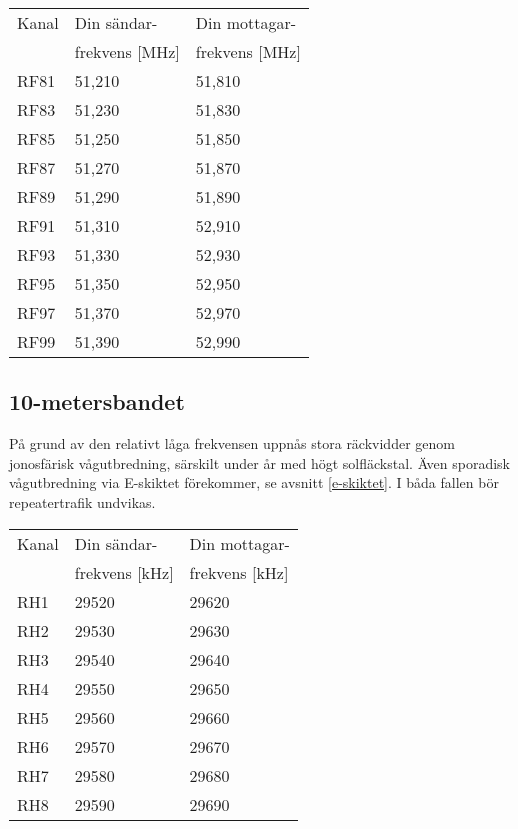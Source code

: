 \bigskip

\begin{tabular}{ l | l | l }
  Kanal & Din sändar- & Din mottagar- \\
        & frekvens [\si{\mega\hertz}] & frekvens [\si{\mega\hertz}] \\
  \hline
  RF81 & 51,210 & 51,810 \\
  RF83 & 51,230 & 51,830 \\
  RF85 & 51,250 & 51,850 \\
  RF87 & 51,270 & 51,870 \\
  RF89 & 51,290 & 51,890 \\
  RF91 & 51,310 & 52,910 \\
  RF93 & 51,330 & 52,930 \\
  RF95 & 51,350 & 52,950 \\
  RF97 & 51,370 & 52,970 \\
  RF99 & 51,390 & 52,990 \\
\end{tabular}



\subsection{10-metersbandet}

På grund av den relativt låga frekvensen uppnås stora räckvidder genom
jonosfärisk vågutbredning, särskilt under år med högt solfläckstal.
Även sporadisk vågutbredning via E-skiktet förekommer, se avsnitt
\ref{e-skiktet}. I båda fallen bör repeatertrafik undvikas.

\bigskip

\begin{tabular}{ l | l | l }
  Kanal & Din sändar- & Din mottagar- \\
        & frekvens [\si{\kilo\hertz}] & frekvens [\si{\kilo\hertz}] \\
  \hline
  RH1 & 29520 & 29620 \\
  RH2 & 29530 & 29630 \\
  RH3 & 29540 & 29640 \\
  RH4 & 29550 & 29650 \\
  RH5 & 29560 & 29660 \\
  RH6 & 29570 & 29670 \\
  RH7 & 29580 & 29680 \\
  RH8 & 29590 & 29690 \\
\end{tabular}


